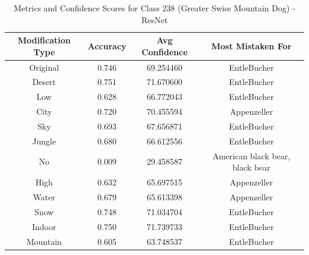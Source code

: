 \begin{table}
	\centering
	\begin{tabular}{|c|c|c|c|}
		\hline
		\textbf{Modification Type} & \textbf{Accuracy} & \textbf{Avg Confidence} & \textbf{Most Mistaken For} \\
		\hline
		Original & 0.746 & 69.254460 & EntleBucher \\
		\hline
		Desert & 0.751 & 71.670600 & EntleBucher \\
		\hline
		Low & 0.628 & 66.772043 & EntleBucher \\
		\hline
		City & 0.720 & 70.455594 & Appenzeller \\
		\hline
		Sky & 0.693 & 67.656871 & EntleBucher \\
		\hline
		Jungle & 0.680 & 66.612556 & EntleBucher \\
		\hline
		No & 0.009 & 29.458587 & American black bear, black bear \\
		\hline
		High & 0.632 & 65.697515 & Appenzeller \\
		\hline
		Water & 0.679 & 65.613398 & Appenzeller \\
		\hline
		Snow & 0.748 & 71.034704 & EntleBucher \\
		\hline
		Indoor & 0.750 & 71.739733 & EntleBucher \\
		\hline
		Mountain & 0.605 & 63.748537 & EntleBucher \\
		\hline
	\end{tabular}
	\caption{Metrics and Confidence Scores for Class 238 (Greater Swiss Mountain Dog) - ResNet}
	\label{tab:metrics_confidence_class_238_resnet}
\end{table}

